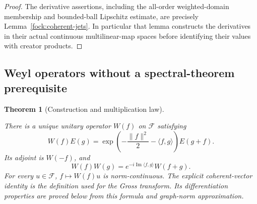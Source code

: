 \documentclass[11pt,a4paper]{article}
\newtheorem{theorem}{Theorem}[section]
\theoremstyle{definition}
\theoremstyle{remark}
\newcommand{\proofid}[1]{\par\smallskip{\normalfont\scriptsize\color{inkblue}Stable ID: \nolinkurl{#1}}\par\smallskip}
\begin{document}
\begin{proof}
The derivative assertions, including the all-order weighted-domain
membership and bounded-ball Lipschitz estimate, are precisely
Lemma~\ref{fock:coherent-jets}. In particular that lemma constructs
the derivatives in their actual continuous multilinear-map spaces
before identifying their values with creator products.
\end{proof}

\subsection{Weyl operators without a spectral-theorem prerequisite}

\begin{theorem}[Construction and multiplication law]\label{fock:weyl}
\proofid{fock:weyl}
\par{}\par\smallskip

There is a unique unitary operator $W(f)$ on $\mathcal F$ satisfying
\[
 W(f)E(g)=\exp\left(-\frac{\|f\|^2}{2}-\langle f,g\rangle\right)
                         E(g+f).
\]
Its adjoint is $W(-f)$, and
\[
 W(f)W(g)=e^{-i\operatorname{Im}\langle f,g\rangle}W(f+g).
\]
For every $u\in\mathcal F$, $f\mapsto W(f)u$ is norm-continuous.
The explicit coherent-vector identity is the definition used for the
Gross transform. Its differentiation properties are proved below from
this formula and graph-norm approximation.
\end{theorem}
\end{document}
